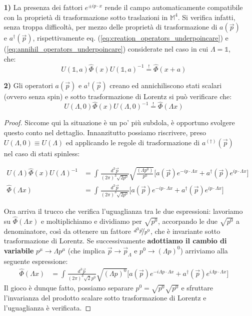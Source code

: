 \documentclass[../main.tex]{subfiles}
\begin{document}
\begin{enumerate}
    \item[\textbf{1)}] La presenza dei fattori \(e^{\pm ip\cdot x}\) rende il campo automaticamente compatibile con la proprietà di trasformazione sotto traslazioni in $\mathbb M^4$. Si verifica infatti, senza troppa difficoltà, per mezzo delle proprietà di trasformazione di $a(\Vec{p})$ e $a^\dagger(\Vec{p})$, rispettivamente eq. (\ref{eq:creation_operators_underpoincare}) e (\ref{eq:annihil_operators_underpoincare}) considerate nel caso in cui $\Lambda = \mathbb 1$, che:
    \[
    U(\mathbb 1, a)\hat{\Phi}(x) U(\mathbb 1, a)^{-1} \overset{!}{=} \hat{\Phi}(x + a)
    \]
    \item[\textbf{2)}] Gli operatori $a(\Vec{p})$ e $a^\dagger(\Vec{p})$ creano ed annichiliscono stati scalari (ovvero senza spin) e sotto trasformazione di Lorentz si può verificare che:
    \[
    U(\Lambda, 0)\hat{\Phi}(x) U(\Lambda, 0)^{-1} \overset{!}{=} \hat{\Phi}(\Lambda x)
    \]
    \begin{proof}
    Siccome qui la situazione è un po' più subdola, è opportuno svolgere questo conto nel dettaglio. Innanzitutto possiamo riscrivere, preso  $U(\Lambda, 0) \equiv  U(\Lambda)$ ed applicando le regole di trasformazione di $a^{(\dagger)}(\Vec{p})$ nel caso di stati spinless:

    \begin{align*}
        U(\Lambda)\hat{\Phi}(x) U(\Lambda)^{-1} &= \int_{}\frac{d^3\Vec{p}}{(2\pi)^3\sqrt{2p^0}} \sqrt{\frac{(\Lambda p^0)}{p^0}}\big[ a(\Vec{p})e^{-ip\cdot \Lambda x} + a^\dagger(\Vec{p})e^{ip\cdot \Lambda x} \big] \\
        \hat{\Phi}(\Lambda x) &= \int_{}\frac{d^3\Vec{p}}{(2\pi)^3\sqrt{2p^0}} \big[ a(\Vec{p})e^{-ip\cdot \Lambda x} + a^\dagger(\Vec{p})e^{ip\cdot \Lambda x} \big]
    \end{align*}

    Ora arriva il trucco che verifica l'uguaglianza tra le due espressioni: lavoriamo su $\hat{\Phi}(\Lambda x)$ e moltiplichiamo e dividiamo per $\sqrt{p^0}$, accorpando le due $\sqrt{p^0}$ a denominatore, così da ottenere un fattore $\nicefrac{d^3\Vec{p}}{p^0}$, che è invariante sotto trasformazione di Lorentz.
    Se successivamente \textbf{adottiamo il cambio di variabile} $p^\mu \rightarrow \Lambda p^\mu$ (che implica $\Vec{p}\rightarrow \Vec{p}_\Lambda$ e $p^0\rightarrow(\Lambda p)^0$) arriviamo alla seguente espressione: 
    \begin{align*}
        \hat{\Phi}(\Lambda x) &= \int_{}\frac{d^3\Vec{p}}{(2\pi)^3\sqrt{2}p^0} \sqrt{(\Lambda p)^0}\big[ a(\Vec{p})e^{-i\Lambda p\cdot \Lambda x} + a^\dagger(\Vec{p})e^{i\Lambda p\cdot \Lambda x} \big]
    \end{align*}
    Il gioco è dunque fatto, possiamo separare $p^0 = \sqrt{p^0}\sqrt{p^0}$ e sfruttare l'invarianza del prodotto scalare sotto trasformazione di Lorentz e l'uguaglianza è verificata.
    \end{proof}
    

\end{enumerate}
\end{document}
